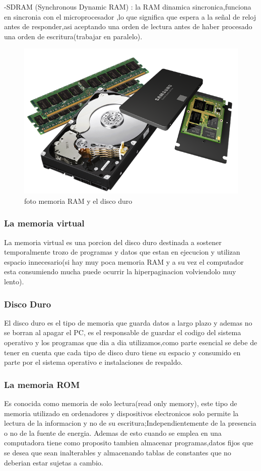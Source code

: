 \documentclass{article}
\begin{document}
            -SDRAM (Synchronous Dynamic RAM) : la RAM dinamica sincronica,funciona en sincronia con el microprocesador ,lo que significa que espera a la señal de reloj antes de responder,asi aceptando una orden de lectura antes  de haber procesado una orden de escritura(trabajar en paralelo).\cite{hardzone}
            
            \begin{figure}[h]
            \includegraphics[width=6 cm]{imagenes/ram+hdd+ssd.png}
            \centering
            \caption{foto memoria RAM y el disco duro}
            \label{fig:ram+hdd+ssd}
            \end{figure}
            
        \subsubsection{La memoria virtual}
        La memoria virtual es una porcion del disco duro destinada a sostener temporalmente trozo de programas y datos que estan en ejecucion y utilizan espacio innecesario(si hay muy poca memoria RAM y a su vez el computador esta consumiendo mucha puede ocurrir la hiperpaginacion volviendolo muy lento).

        \subsubsection{Disco Duro}
        El disco duro es el tipo de memoria que guarda datos a largo plazo y ademas no se borran al apagar el PC, es el responsable de guardar el codigo del sistema operativo y los programas que dia a dia utilizamos,como parte esencial se debe de tener en cuenta que cada tipo de disco duro tiene su espacio y consumido en parte por el sistema operativo e instalaciones de respaldo.\cite{digitaltrends}
        
        \subsubsection{La memoria ROM}
        Es conocida como memoria de solo lectura(read only memory), este tipo de memoria utilizado en ordenadores y dispositivos electronicos solo permite la lectura de la informacion y no de su escritura;Independientemente  de la presencia o no de la fuente de energia. Ademas de esto  cuando se emplea en una computadora tiene como proposito tambien almacenar programas,datos fijos que se desea que sean inalterables y  almacenando tablas de constantes que no deberian estar sujetas a cambio.\cite{aca}
    
\end{document}
